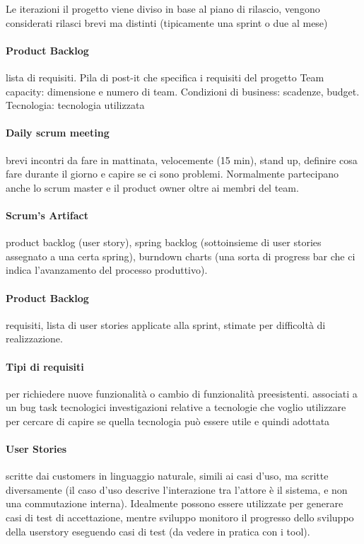 \documentclass[10pt,a4paper]{book}
\begin{document}
Le iterazioni il progetto viene diviso in base al piano di rilascio, vengono considerati rilasci brevi ma distinti (tipicamente una sprint o due al mese)

\paragraph{Product Backlog} lista di requisiti. Pila di post-it che specifica i requisiti del progetto
Team capacity: dimensione e numero di team.
Condizioni di business: scadenze, budget.
Tecnologia: tecnologia utilizzata

\paragraph{Daily scrum meeting} brevi incontri da fare in mattinata, velocemente (15 min), stand up, definire cosa fare durante il giorno e capire se ci sono problemi.
Normalmente partecipano anche lo scrum master e il product owner oltre ai membri del team.

\paragraph{Scrum's Artifact} product backlog (user story), spring backlog (sottoinsieme di user stories assegnato a una certa spring), burndown charts (una sorta di progress bar che ci indica l'avanzamento del processo produttivo).

\paragraph{Product Backlog} requisiti, lista di user stories applicate alla sprint, stimate per difficoltà di realizzazione.

\paragraph{Tipi di requisiti} 
per richiedere nuove funzionalità o cambio di funzionalità preesistenti.
associati a un bug
task tecnologici
investigazioni relative a tecnologie che voglio utilizzare per cercare di capire se quella tecnologia può essere utile e quindi adottata

\paragraph{User Stories} scritte dai customers in linguaggio naturale, simili ai casi d'uso, ma scritte diversamente (il caso d'uso descrive l'interazione tra l'attore è il sistema, e non una commutazione interna). Idealmente possono essere utilizzate per generare casi di test di accettazione, mentre sviluppo monitoro il progresso dello sviluppo della userstory eseguendo casi di test (da vedere in pratica con i tool).
\end{document}
